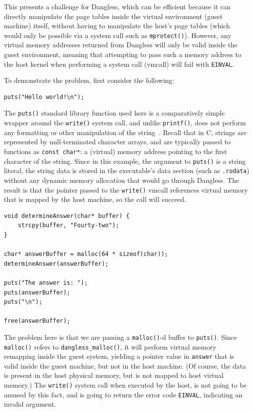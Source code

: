 This presents a challenge for Dangless, which can be efficient because it can directly manipulate the page tables inside the virtual environment (guest machine) itself, without having to manipulate the host's page tables (which would only be possible via a system call such as \lstinline!mprotect()!). However, any virtual memory addresses returned from Dangless will only be valid inside the guest environment, meaning that attempting to pass such a memory address to the host kernel when performing a system call (vmcall) will fail with \lstinline!EINVAL!.

To demonstrate the problem, first consider the following:

\begin{lstlisting}
puts("Hello world!\n");
\end{lstlisting}

The \lstinline!puts()! standard library function used here is a comparatively simple wrapper around the \lstinline!write()! system call, and unlike \lstinline!printf()!, does not perform any formatting or other manipulation of the string~\cite{glibc-puts-analysis}. Recall that in C, strings are represented by null-terminated character arrays, and are typically passed to functions as \lstinline!const char*!: a (virtual) memory address pointing to the first character of the string. Since in this example, the argument to \lstinline!puts()! is a string literal, the string data is stored in the executable's data section (such as \texttt{.rodata}) without any dynamic memory allocation that would go through Dangless. The result is that the pointer passed to the \lstinline!write()! vmcall references virtual memory that is mapped by the host machine, so the call will succeed.

\begin{lstlisting}
void determineAnswer(char* buffer) {
	strcpy(buffer, "Fourty-two");
}

char* answerBuffer = malloc(64 * sizeof(char));
determineAnswer(answerBuffer);

puts("The answer is: ");
puts(answerBuffer);
puts("\n");

free(answerBuffer);
\end{lstlisting}

The problem here is that we are passing a \lstinline!malloc()!-d buffer to \lstinline!puts()!. Since \lstinline!malloc()! refers to \lstinline!dangless_malloc()!, it will perform virtual memory remapping inside the guest system, yielding a pointer value in \lstinline!answer! that is valid inside the guest machine, but not in the host machine. (Of course, the data is present in the host physical memory, but is not mapped to host virtual memory.) The \lstinline!write()! system call when executed by the host, is not going to be amused by this fact, and is going to return the error code \texttt{EINVAL}, indicating an invalid argument.

